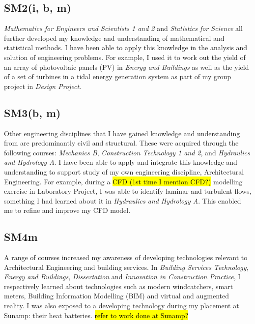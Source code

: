 \subsection*{SM2(i, b, m)}

\textit{Mathematics for Engineers and Scientists 1 and 2} and \textit{Statistics for Science} all further developed my knowledge and understanding of mathematical and statistical methods.
I have been able to apply this knowledge in the analysis and solution of engineering problems.
For example, I used it to work out the yield of an array of photovoltaic panels (PV) in \textit{Energy and Buildings} as well as the yield of a set of turbines in a tidal energy generation system as part of my group project in \textit{Design Project}.


\subsection*{SM3(b, m)}

Other engineering disciplines that I have gained knowledge and understanding from are predominantly civil and structural.
These were acquired through the following courses: \textit{Mechanics B}, \textit{Construction Technology 1 and 2},  and \textit{Hydraulics and Hydrology A}.
I have been able to apply and integrate this knowledge and understanding to support study of my own engineering discipline, Architectural Engineering.
For example, during a \hl{CFD (1st time I mention CFD?)} modelling exercise in Laboratory Project, I was able to identify laminar and turbulent flows, something I had learned about it in \textit{Hydraulics and Hydrology A}.
This enabled me to refine and improve my CFD model.


\subsection*{SM4m}

A range of courses increased my awareness of developing technologies relevant to Architectural Engineering and building services.
In \textit{Building Services Technology}, \textit{Energy and Buildings}, \textit{Dissertation} and \textit{Innovation in Construction Practice}, I respectively learned about technologies such as modern windcatchers, smart meters, Building Information Modelling (BIM) and virtual and augmented reality.
I was also exposed to a developing technology during my placement at Sunamp: their heat batteries.
\hl{refer to work done at Sunamp?}


